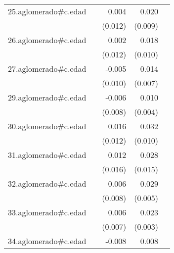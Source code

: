 {\begin{longtable}{l*{4}{D{.}{.}{-1}}}
\addlinespace
25.aglomerado#c.edad&                     &       0.004         &       0.020\sym{*}  &                     \\
            &                     &     (0.012)         &     (0.009)         &                     \\
\addlinespace
26.aglomerado#c.edad&                     &       0.002         &       0.018         &                     \\
            &                     &     (0.012)         &     (0.010)         &                     \\
\addlinespace
27.aglomerado#c.edad&                     &      -0.005         &       0.014         &                     \\
            &                     &     (0.010)         &     (0.007)         &                     \\
\addlinespace
29.aglomerado#c.edad&                     &      -0.006         &       0.010\sym{*}  &                     \\
            &                     &     (0.008)         &     (0.004)         &                     \\
\addlinespace
30.aglomerado#c.edad&                     &       0.016         &       0.032\sym{**} &                     \\
            &                     &     (0.012)         &     (0.010)         &                     \\
\addlinespace
31.aglomerado#c.edad&                     &       0.012         &       0.028         &                     \\
            &                     &     (0.016)         &     (0.015)         &                     \\
\addlinespace
32.aglomerado#c.edad&                     &       0.006         &       0.029\sym{***}&                     \\
            &                     &     (0.008)         &     (0.005)         &                     \\
\addlinespace
33.aglomerado#c.edad&                     &       0.006         &       0.023\sym{***}&                     \\
            &                     &     (0.007)         &     (0.003)         &                     \\
\addlinespace
34.aglomerado#c.edad&                     &      -0.008         &       0.008         &                     \\

\end{longtable}}
